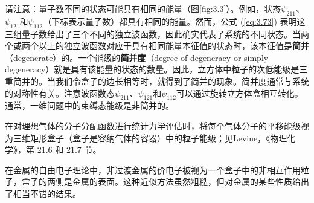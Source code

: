 	请注意：量子数不同的状态可能具有相同的能量（图\ref{fig:3.3}）。例如，状态$\psi_{211}$、$\psi_{121}$和$\psi_{112}$（下标表示量子数）都具有相同的能量。然而，公式 (\ref{eq:3.73}) 表明这三组量子数给出了三个不同的独立波函数，因此确实代表了系统的不同状态。当两个或两个以上的独立波函数对应于具有相同能量本征值的状态时，该本征值是\textbf{简并}（degenerate）的。一个能级的\textbf{简并度}（degree of degeneracy or simply degeneracy）就是具有该能量的状态的数量。因此，立方体中粒子的次低能级是三重简并的。当我们令盒子的边长相等时，就得到了简并的现象。简并度通常与系统的对称性有关。注意波函数态$\psi_{211}$、$\psi_{121}$和$\psi_{112}$可以通过旋转立方体盒相互转化。通常，一维问题中的束缚态能级是非简并的。

	在对理想气体的分子分配函数进行统计力学评估时，将每个气体分子的平移能级视为三维矩形盒子（盒子是容纳气体的容器）中的粒子能级；见Levine，《物理化学》，第 21.6 和 21.7 节。

	在金属的自由电子理论中，非过渡金属的价电子被视为一个盒子中的非相互作用粒子，盒子的两侧是金属的表面。这种近似方法虽然粗糙，但对金属的某些性质给出了相当不错的结果。
	
